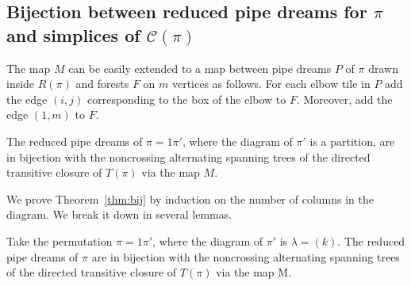 \documentclass[ALCO,ThmDefs]{cedram}
\numberwithin{equation}{section}
\newcommand*\C{{\mathcal{C}}}
\newcommand*\+{\smash{\lower2pt\hbox{\rlap{\vrule height14pt}}\raise2pt\hbox{\rlap{\hskip-3pt \vrule height.4pt depth0pt width14.7pt}}}}
\begin{document}
\subsection{Bijection between reduced pipe dreams for \texorpdfstring{$\pi$}{pi} and simplices of \texorpdfstring{$\C(\pi)$}{C(pi)}}

The map $M$ can be easily extended to a map between pipe dreams $P$ of $\pi$ drawn inside $R(\pi)$ and forests $F$ on $m$ vertices as follows. For each elbow tile in $P$ add the edge $(i,j)$ corresponding to the box of the elbow to $F$. Moreover, add the edge $(1,m)$ to $F$.

\begin{theo}\label{thm:bij}
The reduced pipe dreams of $\pi=1\pi'$, where the diagram of $\pi'$ is a partition, are in bijection with the noncrossing alternating spanning trees of the directed transitive closure of $T(\pi)$ via the map $M$.
\end{theo}

We prove Theorem~\ref{thm:bij} by induction on the number of columns in the diagram. We break it down in several lemmas.

\begin{lemm}\label{lem:base}
Take the permutation $\pi=1\pi'$, where the diagram of $\pi'$ is $\lambda=(k)$. The reduced pipe dreams of $\pi$ are in bijection with the noncrossing alternating spanning trees of the directed transitive closure of $T(\pi)$ via the map M.
\end{lemm}
\end{document}
